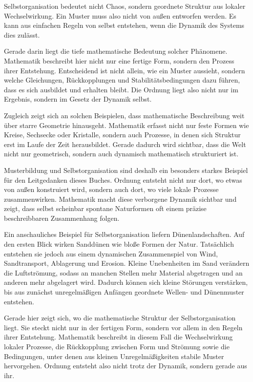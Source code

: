 \begin{DidacticBox}
	\label{box:selbstorganisation}
	Selbstorganisation bedeutet nicht Chaos,
	sondern geordnete Struktur aus lokaler Wechselwirkung.
	Ein Muster muss also nicht von außen entworfen werden.
	Es kann aus einfachen Regeln von selbst entstehen,
	wenn die Dynamik des Systems dies zulässt.
\end{DidacticBox}

Gerade darin liegt die tiefe mathematische Bedeutung solcher Phänomene.
Mathematik beschreibt hier nicht nur eine fertige Form,
sondern den Prozess ihrer Entstehung.
Entscheidend ist nicht allein,
wie ein Muster aussieht,
sondern welche Gleichungen,
Rückkopplungen
und Stabilitätsbedingungen dazu führen,
dass es sich ausbildet und erhalten bleibt.
Die Ordnung liegt also nicht nur im Ergebnis,
sondern im Gesetz der Dynamik selbst.

Zugleich zeigt sich an solchen Beispielen,
dass mathematische Beschreibung weit über starre Geometrie hinausgeht.
Mathematik erfasst nicht nur feste Formen wie Kreise,
Sechsecke
oder Kristalle,
sondern auch Prozesse,
in denen sich Struktur erst im Laufe der Zeit herausbildet.
Gerade dadurch wird sichtbar,
dass die Welt nicht nur geometrisch,
sondern auch dynamisch mathematisch strukturiert ist.

Musterbildung und Selbstorganisation sind deshalb ein besonders starkes Beispiel
für den Leitgedanken dieses Buches.
Ordnung entsteht nicht nur dort,
wo etwas von außen konstruiert wird,
sondern auch dort,
wo viele lokale Prozesse zusammenwirken.
Mathematik macht diese verborgene Dynamik sichtbar
und zeigt,
dass selbst scheinbar spontane Naturformen oft einem präzise beschreibbaren Zusammenhang folgen.

Ein anschauliches Beispiel für Selbstorganisation liefern Dünenlandschaften.
Auf den ersten Blick wirken Sanddünen wie bloße Formen der Natur.
Tatsächlich entstehen sie jedoch aus einem dynamischen Zusammenspiel von Wind,
Sandtransport,
Ablagerung
und Erosion.
Kleine Unebenheiten im Sand verändern die Luftströmung,
sodass an manchen Stellen mehr Material abgetragen
und an anderen mehr abgelagert wird.
Dadurch können sich kleine Störungen verstärken,
bis aus zunächst unregelmäßigen Anfängen geordnete Wellen-
und Dünenmuster entstehen.

Gerade hier zeigt sich,
wo die mathematische Struktur der Selbstorganisation liegt.
Sie steckt nicht nur in der fertigen Form,
sondern vor allem in den Regeln ihrer Entstehung.
Mathematik beschreibt in diesem Fall die Wechselwirkung lokaler Prozesse,
die Rückkopplung zwischen Form und Strömung
sowie die Bedingungen,
unter denen aus kleinen Unregelmäßigkeiten stabile Muster hervorgehen.
Ordnung entsteht also nicht trotz der Dynamik,
sondern gerade aus ihr.

